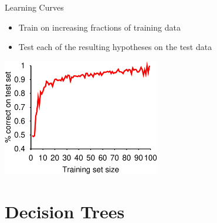\documentclass[14pt]{beamer}
\begin{document}
\begin{frame}{Learning Curves}
	\begin{itemize}
		\item Train on increasing fractions of training data
		\item Test each of the resulting hypotheses on the test data
	\end{itemize}
	\pause
	\begin{center}
		\includegraphics[height=2in]{restaurant-dtl-curve}
	\end{center}
\end{frame}


\section{Decision Trees}
\end{document}
